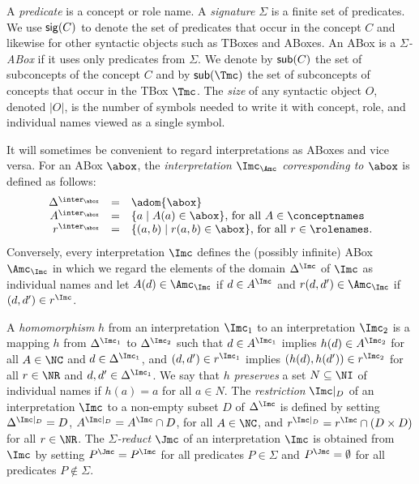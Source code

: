 \documentclass{lmcs}
\theoremstyle{definition}
\begin{document}
A \emph{predicate} is a concept or role name. A \emph{signature}
$\Sigma$ is a finite set of predicates.  We use ${\sf sig}(C)$ to
denote the set of predicates that occur in the concept $C$ and
likewise for other syntactic objects such as TBoxes and ABoxes. An
ABox is a \emph{$\Sigma$-ABox} if it uses only predicates from
$\Sigma$.  We denote by ${\sf sub}(C)$ the set of subconcepts of the
concept $C$ and by ${\sf sub}(\Tmc)$ the set of subconcepts of
concepts that occur in the TBox $\Tmc$. The \emph{size} of any
syntactic object $O$, denoted $|O|$, is the number of
symbols needed to write it with concept, role, and individual names
viewed as a single symbol.

It will sometimes be convenient to regard interpretations as ABoxes
and vice versa. For an ABox $\abox$, the \emph{interpretation
  $\Imc_{\Amc}$ corresponding to $\abox$} is defined as follows:
\[
\begin{array}{rcl}
  \Delta^{\inter_\abox} & = & \adom{\abox}\\
  A^{\inter_\abox}      & = & \{a\mid A(a)\in\abox\}\text{, for all }A\in\conceptnames\\
  r^{\inter_\abox}      & = & \{(a,b)\mid r(a,b)\in\abox\}\text{, for all }r\in\rolenames.
\end{array}
\]
Conversely, every %
interpretation $\Imc$ defines the (possibly infinite) ABox $\Amc_{\Imc}$ 
in which we regard the elements of the domain $\Delta^{\Imc}$ of $\Imc$ as individual names and let
$A(d)\in \Amc_{\Imc}$ if $d\in A^{\Imc}$ and $r(d,d')\in \Amc_{\Imc}$ if $(d,d')\in r^{\Imc}$.

A \emph{homomorphism} $h$ from an interpretation $\Imc_{1}$ to an
interpretation $\Imc_{2}$ is a mapping $h$ from $\Delta^{\Imc_{1}}$ to
$\Delta^{\Imc_{2}}$ such that $d\in A^{\Imc_{1}}$ implies
$h(d)\in A^{\Imc_{2}}$ for all $A\in \NC$ and
$d\in \Delta^{\Imc_{1}}$, and $(d,d')\in r^{\Imc_{1}}$ implies
$(h(d),h(d'))\in r^{\Imc_{2}}$ for all $r\in \NR$ and
$d,d'\in \Delta^{\Imc_{1}}$. We say that $h$ \emph{preserves} a set
$N \subseteq \NI$ of individual names if $h(a)=a$ for all $a\in N$.
The \emph{restriction} $\Imc|_{D}$ of an interpretation $\Imc$ to a
non-empty subset $D$ of $\Delta^{\Imc}$ is defined by setting
$\Delta^{\Imc|_{D}}=D$, $A^{\Imc|_{D}}=A^{\Imc}\cap D$, for all
$A\in \NC$, and $r^{\Imc|_{D}}=r^{\Imc}\cap (D\times D)$ for all
$r\in \NR$. The \emph{$\Sigma$-reduct} $\Jmc$ of an interpretation
$\Imc$ is obtained from $\Imc$ by setting $P^{\Jmc}=P^{\Imc}$ for all
predicates $P\in \Sigma$ and $P^{\Jmc}=\emptyset$ for all predicates
$P\not\in\Sigma$.
\end{document}
